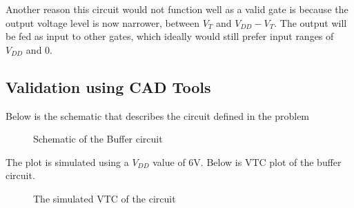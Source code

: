 \documentclass[12pt]{article}
\begin{document}
Another reason this circuit would not function well as a valid gate is because the output voltage level is now narrower, between $V_T$ and $V_{DD} - V_T$. 
The output will be fed as input to other gates, which ideally would still prefer input ranges of $V_{DD}$ and 0. 
\subsection{Validation using CAD Tools}
Below is the schematic that describes the circuit defined in the problem
\begin{figure} [H]
    \centering
    \caption{Schematic of the Buffer circuit}
\end {figure}
The plot is simulated using a $V_{DD}$ value of 6V. Below is VTC plot of the buffer circuit.
\begin{figure} [H]
    \centering
    \caption{The simulated VTC of the circuit}
\end {figure}
\end{document}
